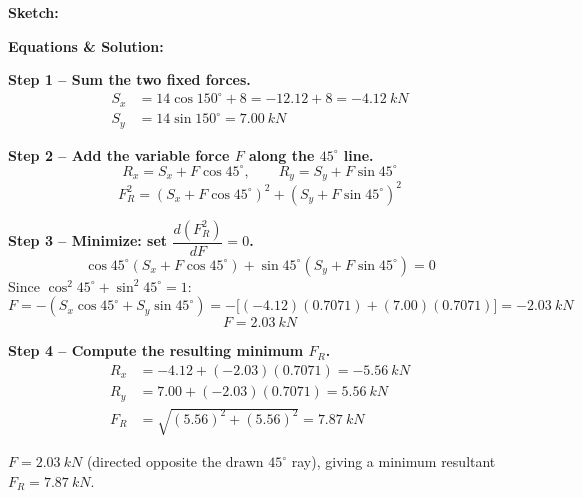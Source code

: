 \documentclass[11pt]{article}
\newcommand{\eqlabel}[1]{\textbf{#1}}
\begin{document}
\textbf{Sketch:}
\begin{center}
\end{center}

\textbf{Equations \& Solution:}

\eqlabel{Step 1 -- Sum the two fixed forces.}
\begin{align*}
    S_x &= 14\cos 150^\circ + 8 = -12.12+8 = \SI{-4.12}{kN} \\
    S_y &= 14 \sin 150^\circ = \SI{7.00}{kN}
\end{align*}

\eqlabel{Step 2 -- Add the variable force $F$ along the $45^\circ$ line.}
\[
    R_x = S_x+F\cos 45^\circ, \qquad R_y = S_y+F\sin 45^\circ
\]
\[
    F_R^2 = (S_x+F\cos 45^\circ)^2+(S_y+F\sin 45^\circ)^2
\]

\eqlabel{Step 3 -- Minimize: set $\dfrac{d(F_R^2)}{dF}=0$.}
\[
    \cos45^\circ (S_x+F\cos45^\circ)+\sin45^\circ(S_y+F\sin45^\circ)=0
\]
Since $\cos^2 45^\circ+\sin^2 45^\circ = 1$:
\[
    F = -\left(S_x\cos45^\circ+S_y\sin45^\circ\right) = -\big[(-4.12)(0.7071)+(7.00)(0.7071)\big] = \SI{-2.03}{kN}
\]
\[
    F = \SI{2.03}{kN}
\]

\eqlabel{Step 4 -- Compute the resulting minimum $F_R$.}
\begin{align*}
    R_x &= -4.12+(-2.03)(0.7071) = \SI{-5.56}{kN} \\
    R_y &= 7.00+(-2.03)(0.7071) = \SI{5.56}{kN} \\
    F_R &= \sqrt{(5.56)^2+(5.56)^2} = \SI{7.87}{kN}
\end{align*}

\begin{finalanswer}
    $F = \SI{2.03}{kN}$ (directed opposite the drawn $45^\circ$ ray), giving a minimum resultant $F_R = \SI{7.87}{kN}$.
\end{finalanswer}
\end{document}
